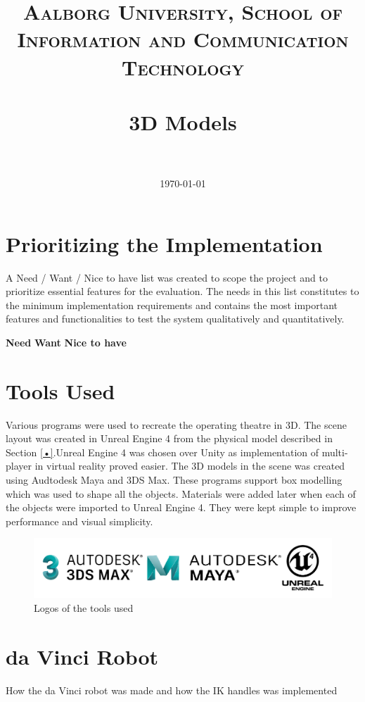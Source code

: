 \documentclass[paper=a4, fontsize=11pt]{scrartcl} %
\title{	
\normalfont \normalsize 
\textsc{Aalborg University, School of Information and Communication Technology} \\ [25pt] %
\horrule{0.5pt} \\[0.4cm] %
\huge 3D Models \\ %
\horrule{2pt} \\[0.5cm] %
}
\date{\normalsize\today} %
\numberwithin{equation}{section} %
\numberwithin{figure}{section} %
\numberwithin{table}{section} %
\begin{document}
\maketitle %
\section{Prioritizing the Implementation}

A Need / Want / Nice to have list was created to scope the project and to prioritize essential features for the evaluation. The needs in this list constitutes to the minimum implementation requirements and contains the most important features and functionalities to test the system qualitatively and quantitatively. 

\textbf{Need}
\textbf{Want}
\textbf{Nice to have}
 

\section{Tools Used}
Various programs were used to recreate the operating theatre in 3D. The scene layout was created in Unreal Engine 4 from the physical model described in Section \ref{•}.Unreal Engine 4 was chosen over Unity as implementation of multi-player in virtual reality proved easier. 
The 3D models in the scene was created using Audtodesk Maya and 3DS Max. These programs support box modelling which was used to shape all the objects. 
Materials were added later when each of the objects were imported to Unreal Engine 4. They were kept simple to improve performance and visual simplicity.

\begin{figure}[H]
\centering
\includegraphics[width=\textwidth]{tools.png}
\caption{Logos of the tools used}
\end{figure}



\section{da Vinci Robot}

How the da Vinci robot was made and how the IK handles was implemented
\end{document}
